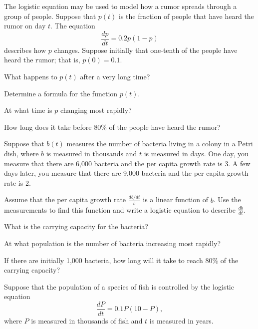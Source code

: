 \begin{exercises} 
  \item  The logistic equation may be used to model how a rumor spreads
    through a group of people.  Suppose that $p(t)$ is the fraction of
    people that have heard the rumor on day $t$.  The equation
    $$
    \frac{dp}{dt} = 0.2p(1-p)
    $$
    describes how $p$ changes.  Suppose initially that one-tenth of
    the people have heard the rumor; that is, $p(0) = 0.1$.

    \ba
    \item What happens to $p(t)$ after a very long time?

    \item Determine a formula for the function $p(t)$.

    \item At what time is $p$ changing most rapidly?

    \item How long does it take before 80\% of the people have heard
      the rumor?

      \ea

  \item Suppose that $b(t)$ measures the number of bacteria living in
    a colony in a Petri dish, where $b$ is measured in thousands and
    $t$ is measured in days.  One day, you measure that there are
    6,000 bacteria and the per capita growth rate is 3.  A few days
    later, you measure that there are 9,000 bacteria and the per
    capita growth rate is 2.  

    \ba
  \item Assume that the per capita growth rate 
    $\frac{db/dt}{b}$ is a linear function of $b$.  Use the
    measurements to find this function and write a logistic equation
    to describe $\frac{db}{dt}$.

  \item What is the carrying capacity for the bacteria?

  \item At what population is the number of bacteria increasing most
    rapidly?
    
  \item If there are initially 1,000 bacteria, how long will it take
    to reach 80\% of the carrying capacity?

    \ea

  \item 
    Suppose that the population of a species of fish is controlled by
    the logistic equation
    $$
    \frac{dP}{dt} = 0.1P(10 - P),
    $$
    where $P$ is measured in thousands of fish and $t$ is measured in
    years.  


\end{exercises}

